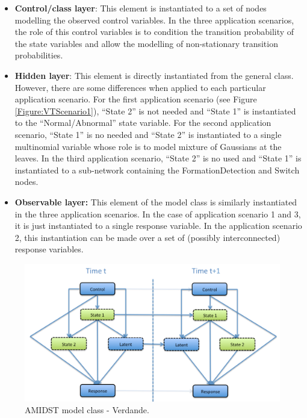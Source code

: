 \begin{itemize}
\item \textbf{Control/class layer}:  This element is instantiated to a set of nodes modelling the observed control variables. In the three application scenarios, the role of this control variables is to condition the transition probability of the state variables and allow the modelling of non-stationary transition probabilities.  

\item \textbf{Hidden layer}: This element is directly instantiated from the general class. However, there are some differences when applied to each particular application scenario. For the first application scenario (see Figure \ref{Figure:VTScenario1}),  ``State 2'' is not needed and ``State 1'' is instantiated to the ``Normal/Abnormal'' state variable. For the second application scenario, ``State 1'' is no needed and ``State 2'' is instantiated to a single multinomial variable whose role is to model mixture of Gaussians at the leaves. In the third application scenario, ``State 2'' is no used and ``State 1'' is instantiated to a sub-network containing the FormationDetection and Switch nodes. 

\item \textbf{Observable layer: } This element of the model class is similarly instantiated in the three application scenarios. In the case of application scenario 1 and 3, it is just instantiated to a single response variable. In the application scenario 2, this instantiation can be made over a set of (possibly interconnected) response variables. 
\end{itemize}



\begin{figure}[ht!]
\begin{center}
\includegraphics[scale=0.39]{./figures/AMIDSTModelClassVerdande}
\caption{\label{Figure:AMIDSTModelClassVerdande} AMIDST model class - Verdande.}
\end{center}
\end{figure}


